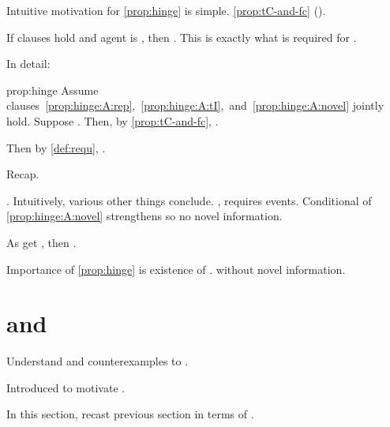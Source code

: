 \begin{note}
  Intuitive motivation for \autoref{prop:hinge} is simple.
  \autoref{prop:tC-and-fc} ().

  If clauses hold and agent is \tCV{}, then \fc{}.
  This is exactly what is required for \requ{}.

  In detail:

  \begin{argument}{prop:hinge}
    Assume~ clauses~\ref{prop:hinge:A:rep},~\ref{prop:hinge:A:tI},~and~\ref{prop:hinge:A:novel} jointly hold.
    Suppose \tCV{}.
    Then, by \autoref{prop:tC-and-fc}, \fc{}.

    Then by \autoref{def:requ}, \requ{}.
  \end{argument}

  Recap.

  \tCV{}.
  Intuitively, various other things conclude.
  \tRep{}, requires events.
  Conditional of \autoref{prop:hinge:A:novel} strengthens so no novel information.

  As get \fc{}, then \requ{}.

  Importance of \autoref{prop:hinge} is existence of \requ{}.
  \tCV{} without novel information.
\end{note}



\section{ and \issueConstraint{}}
\label{sec:tpyically-concluding}

\begin{note}
  Understand \requ{} and counterexamples to \issueConstraint{}.

  Introduced \tCV{} to motivate \requ{}.

  In this section, recast previous section in terms of \tCV{}.
\end{note}

\subsection{}
\label{cha:binding:tCon}

